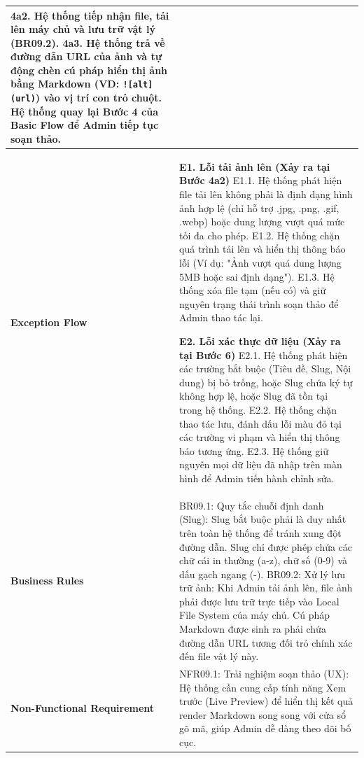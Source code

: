 \documentclass[a4paper,12pt]{article}
\begin{document}
\begin{longtable}{|p{4cm}|p{11.5cm}|}
4a2. Hệ thống tiếp nhận file, tải lên máy chủ và lưu trữ vật lý (BR09.2). \newline
4a3. Hệ thống trả về đường dẫn URL của ảnh và tự động chèn cú pháp hiển thị ảnh bằng Markdown (VD: \texttt{![alt](url)}) vào vị trí con trỏ chuột. \newline
Hệ thống quay lại Bước 4 của Basic Flow để Admin tiếp tục soạn thảo. \\ \hline
\textbf{Exception Flow} & 
\textbf{E1. Lỗi tải ảnh lên (Xảy ra tại Bước 4a2)} \newline
E1.1. Hệ thống phát hiện file tải lên không phải là định dạng hình ảnh hợp lệ (chỉ hỗ trợ .jpg, .png, .gif, .webp) hoặc dung lượng vượt quá mức tối đa cho phép. \newline
E1.2. Hệ thống chặn quá trình tải lên và hiển thị thông báo lỗi (Ví dụ: "Ảnh vượt quá dung lượng 5MB hoặc sai định dạng"). \newline
E1.3. Hệ thống xóa file tạm (nếu có) và giữ nguyên trạng thái trình soạn thảo để Admin thao tác lại. \newline

\textbf{E2. Lỗi xác thực dữ liệu (Xảy ra tại Bước 6)} \newline
E2.1. Hệ thống phát hiện các trường bắt buộc (Tiêu đề, Slug, Nội dung) bị bỏ trống, hoặc Slug chứa ký tự không hợp lệ, hoặc Slug đã tồn tại trong hệ thống. \newline
E2.2. Hệ thống chặn thao tác lưu, đánh dấu lỗi màu đỏ tại các trường vi phạm và hiển thị thông báo tương ứng. \newline
E2.3. Hệ thống giữ nguyên mọi dữ liệu đã nhập trên màn hình để Admin tiến hành chỉnh sửa. \\ \hline
\textbf{Business Rules} & 
BR09.1: Quy tắc chuỗi định danh (Slug): Slug bắt buộc phải là duy nhất trên toàn hệ thống để tránh xung đột đường dẫn. Slug chỉ được phép chứa các chữ cái in thường (a-z), chữ số (0-9) và dấu gạch ngang (-). \newline
BR09.2: Xử lý lưu trữ ảnh: Khi Admin tải ảnh lên, file ảnh phải được lưu trữ trực tiếp vào Local File System của máy chủ. Cú pháp Markdown được sinh ra phải chứa đường dẫn URL tương đối trỏ chính xác đến file vật lý này. \\ \hline
\textbf{Non-Functional Requirement} & 
NFR09.1: Trải nghiệm soạn thảo (UX): Hệ thống cần cung cấp tính năng Xem trước (Live Preview) để hiển thị kết quả render Markdown song song với cửa sổ gõ mã, giúp Admin dễ dàng theo dõi bố cục. \\ \hline
\end{longtable}
\end{document}
